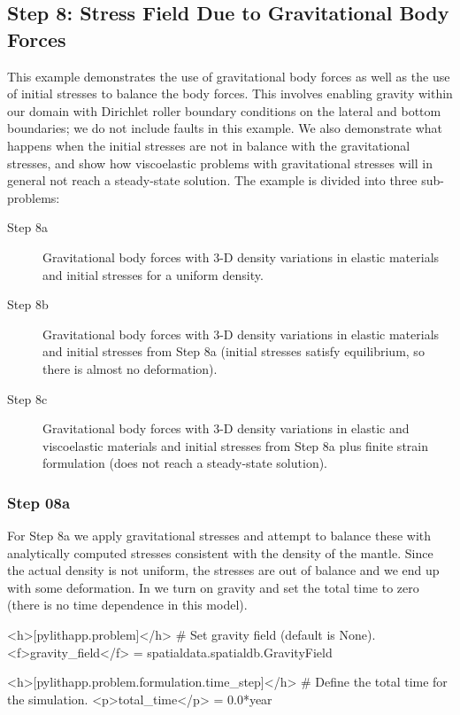 \subsection{Step 8: Stress Field Due to Gravitational Body Forces}

This example demonstrates the use of gravitational body forces as well
as the use of initial stresses to balance the body forces. This
involves enabling gravity within our domain with Dirichlet roller
boundary conditions on the lateral and bottom boundaries; we do not
include faults in this example.  We also demonstrate what happens when
the initial stresses are not in balance with the gravitational
stresses, and show how viscoelastic problems with gravitational
stresses will in general not reach a steady-state solution. The
example is divided into three sub-problems:
\begin{description}
\item[Step 8a] Gravitational body forces with 3-D density variations
  in elastic materials and initial stresses for a uniform density.
\item[Step 8b] Gravitational body forces with 3-D density variations
  in elastic materials and initial stresses from Step 8a (initial
  stresses satisfy equilibrium, so there is almost no deformation).
\item[Step 8c] Gravitational body forces with 3-D density variations
  in elastic and viscoelastic materials and initial stresses from
  Step 8a plus finite strain formulation (does not reach a steady-state
  solution).
\end{description}

\subsubsection{Step 08a}

For Step 8a we apply gravitational stresses and attempt to balance
these with analytically computed stresses consistent with the density
of the mantle. Since the actual density is not uniform, the stresses
are out of balance and we end up with some deformation. In
 we turn on gravity and set the total time to
zero (there is no time dependence in this model).
\begin{cfg}
<h>[pylithapp.problem]</h>
# Set gravity field (default is None).
<f>gravity_field</f> = spatialdata.spatialdb.GravityField

<h>[pylithapp.problem.formulation.time_step]</h>
# Define the total time for the simulation.
<p>total_time</p> = 0.0*year
\end{cfg}

